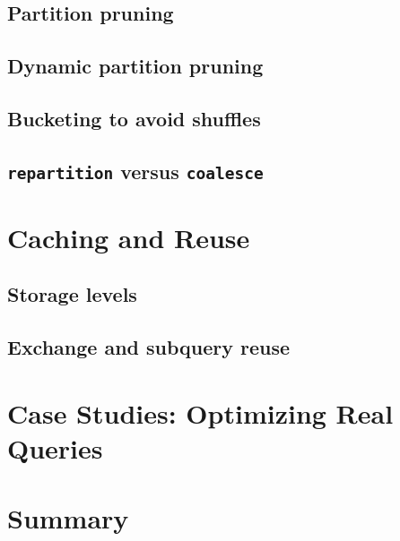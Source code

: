 \subsection{Partition pruning}
\tbd

\subsection{Dynamic partition pruning}
\tbd

\subsection{Bucketing to avoid shuffles}
\tbd

\subsection{\texttt{repartition} versus \texttt{coalesce}}
\tbd

\section{Caching and Reuse}
\label{sec:qo-caching}

\subsection{Storage levels}
\tbd

\subsection{Exchange and subquery reuse}
\tbd

\section{Case Studies: Optimizing Real Queries}
\label{sec:qo-cases}
\tbd

\section{Summary}
\tbd
